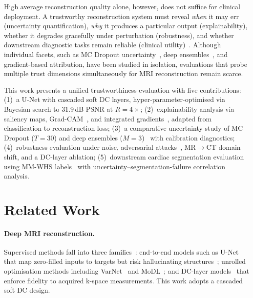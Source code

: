 \documentclass[runningheads]{llncs}
\begin{document}
High average reconstruction quality alone, however, does not suffice for clinical deployment. A trustworthy reconstruction system must reveal \emph{when} it may err (uncertainty quantification), \emph{why} it produces a particular output (explainability), whether it degrades gracefully under perturbation (robustness), and whether downstream diagnostic tasks remain reliable (clinical utility)~\cite{atalik2026tgvn,kaur2022trustworthy}. Although individual facets, such as MC Dropout uncertainty~\cite{gal2016}, deep ensembles~\cite{lakshminarayanan2017}, and gradient-based attribution, have been studied in isolation, evaluations that probe multiple trust dimensions simultaneously for MRI reconstruction remain scarce.

This work presents a unified trustworthiness evaluation with five contributions: (1)~a U-Net with cascaded soft DC layers, hyper-parameter-optimised via Bayesian search to 31.9\,dB PSNR at $R{=}4{\times}$; (2)~explainability analysis via saliency maps, Grad-CAM~\cite{selvaraju2017}, and integrated gradients~\cite{sundararajan2017}, adapted from classification to reconstruction loss; (3)~a comparative uncertainty study of MC Dropout ($T{=}30$) and deep ensembles ($M{=}3$)~\cite{lakshminarayanan2017} with calibration diagnostics; (4)~robustness evaluation under noise, adversarial attacks~\cite{goodfellow2015explaining,madry2018towards}, MR$\to$CT domain shift, and a DC-layer ablation; (5)~downstream cardiac segmentation evaluation using MM-WHS labels~\cite{zhuang2019mmwhs} with uncertainty--segmentation-failure correlation analysis.

\section{Related Work}\label{sec:related}

\paragraph{Deep MRI reconstruction.}
Supervised methods fall into three families~\cite{safari2025}: end-to-end models such as U-Net~\cite{ronneberger2015} that map zero-filled inputs to targets but risk hallucinating structures~\cite{antun2020instabilities}; unrolled optimisation methods including VarNet~\cite{hammernik2018} and MoDL~\cite{aggarwal2019modl}; and DC-layer models~\cite{schlemper2018} that enforce fidelity to acquired k-space measurements. This work adopts a cascaded soft DC design.
\end{document}

